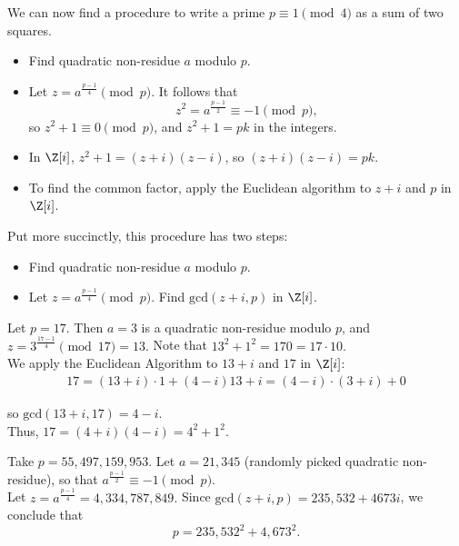 \documentclass[11pt]{article}
\begin{document}

We can now find a procedure to write a prime $p \equiv 1 \pmod 4$ as a sum of two squares.
\begin{itemize}
    \item Find quadratic non-residue $a$ modulo $p$.
    \item Let $z = a^{\frac{p-1}{4}} \pmod p.$ It follows that 
    \[
        z^2 = a^{\frac{p-1}{2}} \equiv -1 \pmod p,
    \]
    so $z^2 + 1 \equiv 0 \pmod p$, and $z^2 + 1 = pk$ in the integers.
    \item In $\Z[i]$, $z^2 + 1 = (z+i)(z-i)$, so $(z+i)(z-i) = pk.$
    \item To find the common factor, apply the Euclidean algorithm to $z+i$ and $p$ in $\Z[i]$.
\end{itemize}

Put more succinctly, this procedure has two steps:
\begin{itemize}
    \item Find quadratic non-residue $a$ modulo $p$.
    \item Let $z = a^{\frac{p-1}{4}} \pmod p.$ Find $\mathrm{gcd}(z+i, p)$ in $\Z[i]$. 
\end{itemize} 

\begin{eg}
Let $p = 17$. Then $a = 3$ is a quadratic non-residue modulo $p$, and $z = 3^{\frac{17-1}{4}} \pmod{17} = 13.$ Note that $13^2 + 1^2 = 170 = 17 \cdot 10.$ \\

We apply the Euclidean Algorithm to $13+i$ and $17$ in $\Z[i]$:
\begin{align*}
    17 = (13+i) \cdot 1 + (4-i)
    13+i = (4-i) \cdot (3+i) + 0
\end{align*}

so $\mathrm{gcd}(13+i, 17) = 4-i$. \\

Thus, $17 = (4+i)(4-i) = \boxed{4^2 + 1^2}.$
\end{eg}

\begin{eg}
Take $p = 55, 497, 159, 953$. Let $a = 21, 345$ (randomly picked quadratic non-residue), so that $a^{\frac{p-1}{2}} \equiv -1 \pmod p$. \\

Let $z = a^{\frac{p-1}{4}} = 4,334,787,849.$ Since $\mathrm{gcd}(z+i, p) = 235,532 + 4673i$, we conclude that
\[
    p = 235,532^2 + 4,673^2.
\] 
\end{eg}
\end{document}
